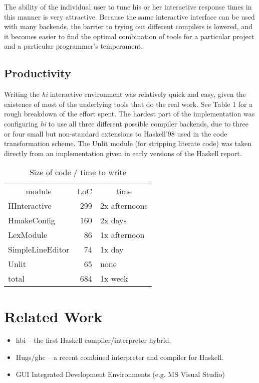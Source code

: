 \documentclass[a4paper]{llncs}
\begin{document}
The ability of the individual user to tune his or her interactive
response times in this manner is very attractive.  Because the same
interactive interface can be used with many backends, the barrier to
trying out different compilers is lowered, and it becomes easier to
find the optimal combination of tools for a particular project and
a particular programmer's temperament.


\subsection{Productivity}

Writing the {\em hi} interactive environment was relatively quick and
easy, given the existence of most of the underlying tools that do the
real work.  See Table 1 for a rough breakdown of the effort spent.
The hardest part of the implementation was configuring {\em hi} to
use all three different possible compiler backends, due to three or
four small but non-standard extensions to Haskell'98 used in the code
transformation scheme.  The Unlit module (for stripping literate code)
was taken directly from an implementation given in early versions of
the Haskell report.

\begin{table}
\begin{center}
\begin{tabular}{lrl}

\multicolumn{1}{c}{module} & \multicolumn{1}{c}{LoC} & \multicolumn{1}{c}{time}
  \\
    HInteractive	& 299	& 2x afternoons \\
    HmakeConfig		& 160	& 2x days \\
    LexModule		&  86	& 1x afternoon \\
    SimpleLineEditor	&  74	& 1x day \\
    Unlit	 	&  65	& none \\
 \hline
    total		& 684	& 1x week \\
\end{tabular}
\caption{Size of code / time to write}
\end{center}
\end{table}


\section{Related Work}

\begin{itemize}
\item
  hbi -- the first Haskell compiler/interpreter hybrid.
\item
  Hugs/ghc -- a recent combined interpreter and compiler for Haskell.
\item
  GUI Integrated Development Environments (e.g. MS Visual Studio)
\end{itemize}
\end{document}
